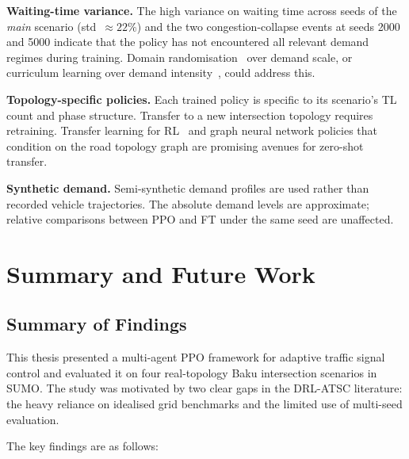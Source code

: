 \documentclass[12pt,oneside,a4paper]{report}
\newcommand{\ppo}{\textsc{PPO}}
\newcommand{\ft}{\textsc{FT}}
\newcommand{\sumo}{\textsc{SUMO}}
\begin{document}
\textbf{Waiting-time variance.}
The high variance on waiting time across seeds of the \textit{main}
scenario (std~$\approx 22\%$) and the two congestion-collapse events
at seeds 2000 and 5000 indicate that the policy has not encountered
all relevant demand regimes during training.  Domain randomisation~\cite{domainrand2017}
over demand scale, or curriculum learning over demand intensity~\cite{curriculum2009},
could address this.

\textbf{Topology-specific policies.}
Each trained policy is specific to its scenario's TL count and phase
structure.  Transfer to a new intersection topology requires
retraining.  Transfer learning for RL~\cite{transferrl2009} and
graph neural network policies that condition on the road topology
graph are promising avenues for zero-shot transfer.

\textbf{Synthetic demand.}
Semi-synthetic demand profiles are used rather than recorded vehicle
trajectories.  The absolute demand levels are approximate; relative
comparisons between \ppo{} and \ft{} under the same seed are
unaffected.

\chapter{Summary and Future Work}
\label{chap:conc}

\section{Summary of Findings}
\label{sec:summary}

This thesis presented a multi-agent \ppo{} framework for adaptive
traffic signal control and evaluated it on four real-topology Baku
intersection scenarios in \sumo{}. The study was motivated by two clear
gaps in the DRL-ATSC literature: the heavy reliance on idealised grid
benchmarks and the limited use of multi-seed evaluation.

The key findings are as follows:
\end{document}

